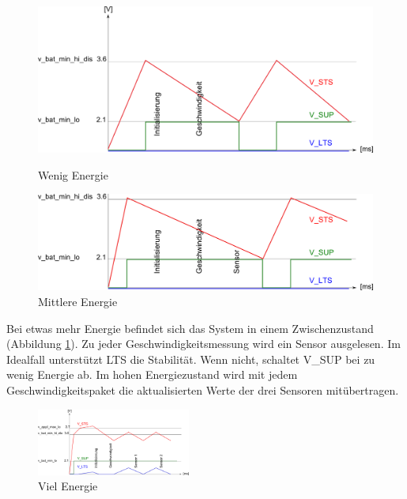 \begin{figure}[ht]
    \begin{minipage}[t]{0.5\textwidth}
      \includegraphics[width=1.0\textwidth]{3Vorgehen/imag/LOW_ENERGY.png}
      \caption{Wenig Energie}
      \label{LOW_ENER}
    \end{minipage}
    \begin{minipage}[t]{0.5\textwidth}
      \includegraphics[width=1.0\textwidth]{3Vorgehen/imag/MIDDLE_ENERGY.png}
      \caption{Mittlere Energie}
      \label{MID_ENER}
    \end{minipage}
\end{figure}

Bei etwas mehr Energie befindet sich das System in einem Zwischenzustand (Abbildung \ref{MID_ENER}). Zu jeder Geschwindigkeitsmessung wird ein Sensor ausgelesen. Im Idealfall unterstützt LTS die Stabilität. Wenn nicht, schaltet V\_SUP bei zu wenig Energie ab. Im hohen Energiezustand wird mit jedem Geschwindigkeitspaket die aktualisierten Werte der drei Sensoren mitübertragen. 

\begin{figure}[ht]
  \includegraphics[width=0.45\textwidth]{3Vorgehen/imag/HIGH_ENERGY.png}
  \caption{Viel Energie}
  \label{HIGH_ENER}
\end{figure}


